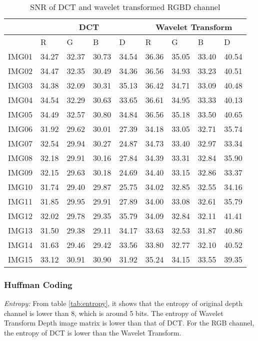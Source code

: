 \begin{table*}
\center
\begin{tabular}{|l|l|l|l|l|l|l|l|l|}\hline
& \multicolumn{4}{|c|}{DCT} & \multicolumn{4}{|c|}{Wavelet Transform} \\\hline
& R & G & B & D & R & G & B & D  \\\hline
IMG01 & 34.27 & 32.37 & 30.73 & 34.54 & 36.36 & 35.05 & 33.40 & 40.54\\\hline
IMG02 & 34.47 & 32.35 & 30.49 & 34.36 & 36.56 & 34.93 & 33.23 & 40.51\\\hline
IMG03 & 34.38 & 32.09 & 30.31 & 35.13 & 36.42 & 34.71 & 33.09 & 40.48\\\hline
IMG04 & 34.54 & 32.29 & 30.63 & 33.65 & 36.61 & 34.95 & 33.33 & 40.13\\\hline
IMG05 & 34.49 & 32.57 & 30.80 & 34.84 & 36.56 & 35.18 & 33.50 & 40.65\\\hline
IMG06 & 31.92 & 29.62 & 30.01 & 27.39 & 34.18 & 33.05 & 32.71 & 35.74\\\hline
IMG07 & 32.54 & 29.94 & 30.27 & 24.87 & 34.73 & 33.40 & 32.97 & 33.34\\\hline
IMG08 & 32.18 & 29.91 & 30.16 & 27.84 & 34.39 & 33.31 & 32.84 & 35.90\\\hline
IMG09 & 32.15 & 29.63 & 30.18 & 24.69 & 34.40 & 33.15 & 32.86 & 33.37\\\hline
IMG10 & 31.74 & 29.40 & 29.87 & 25.75 & 34.02 & 32.85 & 32.55 & 34.16\\\hline
IMG11 & 31.85 & 29.95 & 29.91 & 27.89 & 34.00 & 33.08 & 32.61 & 35.79\\\hline
IMG12 & 32.02 & 29.78 & 29.35 & 35.79 & 34.09 & 32.84 & 32.11 & 41.41\\\hline
IMG13 & 31.50 & 29.38 & 29.11 & 34.17 & 33.63 & 32.53 & 31.87 & 40.86\\\hline
IMG14 & 31.63 & 29.46 & 29.42 & 33.56 & 33.80 & 32.77 & 32.10 & 40.52\\\hline
IMG15 & 33.12 & 30.91 & 30.90 & 31.92 & 35.24 & 34.15 & 33.55 & 39.35\\\hline
\end{tabular}
\caption{SNR of DCT and wavelet transformed RGBD channel}
\label{tab:snr}
\end{table*}


\subsubsection{Huffman Coding}

\textit{Entropy:} From table \ref{tab:entropy}, it shows that the entropy of original depth channel is lower than 8, which is around 5 bits. 
The entropy of Wavelet Transform Depth image matrix is lower than that of DCT. For the RGB channel, the entropy of DCT is lower than the Wavelet Transform.

